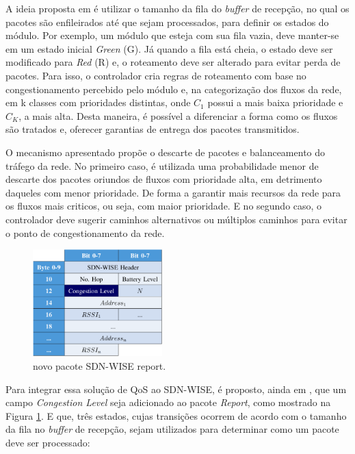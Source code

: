 A ideia proposta em  é utilizar o tamanho da fila do \textit{buffer} de recepção, no qual os pacotes são enfileirados até que sejam processados, para definir os estados do módulo. Por exemplo, um módulo que esteja com sua fila vazia, deve manter-se em um estado inicial \textit{Green} (G). Já quando a fila está cheia, o estado deve ser modificado para \textit{Red} (R) e, o roteamento deve ser alterado para evitar perda de pacotes. Para isso, o controlador cria regras de roteamento com base no congestionamento percebido pelo módulo e, na categorização dos fluxos da rede, em k classes com prioridades distintas, onde $C_1$ possui a mais baixa prioridade e $C_K$, a mais alta. Desta maneira, é possível a diferenciar a forma como os fluxos são tratados e, oferecer garantias de entrega dos pacotes transmitidos. 

O mecanismo apresentado propõe o descarte de pacotes e balanceamento do tráfego da rede. No primeiro caso, é utilizada uma probabilidade menor de descarte dos pacotes oriundos de fluxos com prioridade alta, em detrimento daqueles com menor prioridade. De forma a garantir mais recursos da rede para os fluxos mais criticos, ou seja, com maior prioridade. E no segundo caso, o controlador deve sugerir caminhos alternativos ou múltiplos caminhos para evitar o ponto de congestionamento da rede.

\begin{figure}[!htb]
    \centering
    \includegraphics[width=5cm]{figs/NewReport.png}
    \caption{novo pacote SDN-WISE report. \cite{di2016exploiting}}
    \label{NewReport}
\end{figure}

Para integrar essa solução de \ac{QoS} ao \ac{SDN-WISE}, é proposto, ainda em , que um campo \textit{Congestion Level} seja adicionado ao pacote \textit{Report}, como mostrado na Figura \ref{NewReport}. E que, três estados, cujas transições ocorrem de acordo com o tamanho da fila no \textit{buffer} de recepção, sejam utilizados para determinar como um pacote deve ser processado:


